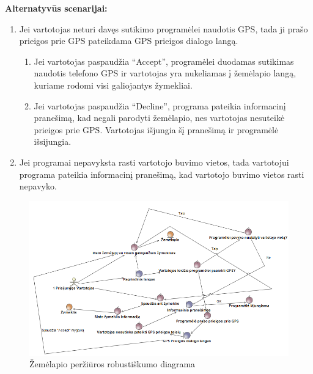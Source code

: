 \documentclass{VUMIFPSkursinis}
\begin{document}
	\textbf{Alternatyvūs scenarijai:}
	\begin{enumerate}[itemsep=-2mm]
		\item Jei vartotojas neturi davęs sutikimo programėlei naudotis GPS, tada ji prašo prieigos prie GPS pateikdama GPS prieigos dialogo langą. 
		\begin{enumerate}[itemsep=-2mm]
			\item Jei vartotojas paspaudžia “Accept”, programėlei duodamas sutikimas naudotis telefono GPS ir vartotojas yra nukeliamas į žemėlapio langą, kuriame rodomi visi galiojantys žymekliai.
			\item Jei vartotojas paspaudžia “Decline”, programa pateikia informacinį pranešimą, kad negali parodyti žemėlapio, nes vartotojas nesuteikė prieigos prie GPS. Vartotojas išjungia šį pranešimą ir programėlė išsijungia.
		\end{enumerate} 
		\item Jei programai nepavyksta rasti vartotojo buvimo vietos, tada vartotojui programa pateikia informacinį pranešimą, kad vartotojo buvimo vietos rasti nepavyko.
	\end{enumerate} 
		\begin{figure}[H]
				\centering
				\includegraphics[scale=0.6]{img/Žemėlapio_redagavimas}
				\caption{Žemėlapio peržiūros robustiškumo diagrama}
				\label{img:Žemėlapio redagavimas. Žymeklių peržiūra}
			\end{figure}
\end{document}
